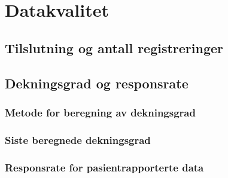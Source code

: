 \documentclass{article}
\begin{document}
    \newpage
    
    \section{Datakvalitet}
    
    \subsection{Tilslutning og antall registreringer}
    
    
    \subsection{Dekningsgrad og responsrate}

    
    \subsubsection{Metode for beregning av dekningsgrad}
    
    
    \subsubsection{Siste beregnede dekningsgrad}

    
    
    \subsubsection{Responsrate for pasientrapporterte data}
    
\end{document}
